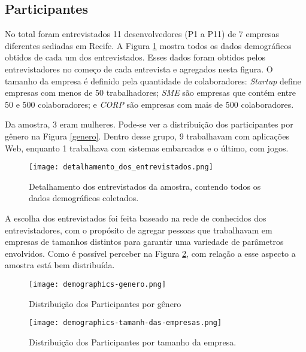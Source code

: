 \subsection{Participantes}

No total foram entrevistados 11 desenvolvedores (P1 a P11) de 7 empresas diferentes sediadas em Recife. A Figura \ref{detalhamento_dos_entrevistados} mostra todos os dados demográficos obtidos de cada um dos entrevistados. Esses dados foram obtidos pelos entrevistadores no começo de cada entrevista e agregados nesta figura. O tamanho da empresa é definido pela quantidade de colaboradores: \emph{Startup} define empresas com menos de 50 trabalhadores; \emph{SME} são empresas que contém entre 50 e 500 colaboradores; e \emph{CORP} são empresas com mais de 500 colaboradores.


Da amostra, 3 eram mulheres. Pode-se ver a distribuição dos participantes por gênero na Figura \ref{genero}. Dentro desse grupo, 9 trabalhavam com aplicações Web, enquanto 1 trabalhava com sistemas embarcados e o último, com jogos.

\begin{figure}[h]
\centering
\texttt{[image: detalhamento\_dos\_entrevistados.png]}
\caption{Detalhamento dos entrevistados da amostra, contendo todos os dados demográficos coletados.}
\label{detalhamento_dos_entrevistados}
\end{figure}


A escolha dos entrevistados foi feita baseado na rede de conhecidos dos entrevistadores, com o propósito de agregar pessoas que trabalhavam em empresas de tamanhos distintos para garantir uma variedade de parâmetros envolvidos. Como é possível perceber na Figura \ref{tamanho_empresa}, com relação a esse aspecto a amostra está bem distribuída. 

\begin{figure}
\centering
\begin{minipage}{.48\textwidth}
    \centering
    \texttt{[image: demographics-genero.png]}
    \caption[Distribuição dos Participantes por gênero]{
    Distribuição dos Participantes por gênero
    }
    \label{genero}
\end{minipage}%
\hfill
\begin{minipage}{.48\textwidth}
    \centering
    \texttt{[image: demographics-tamanh-das-empresas.png]}
    \caption[Distribuição dos Participantes por tamanho da empresa]{
    Distribuição dos Participantes por tamanho da empresa.
    }
    \label{tamanho_empresa}
\end{minipage}
\end{figure}

